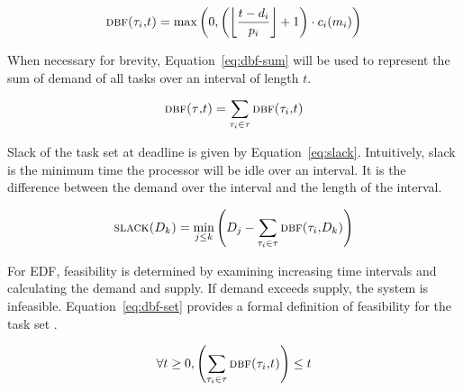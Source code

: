 \begin{definition}
  \begin{equation}
    \label{eq:dbf}
    \text{\sc{dbf}(\ensuremath{\tau_{i}},${t}$)} = \max \left(0,
      \left( \left\lfloor \frac{t - d_i}{p_i} \right\rfloor + 1
      \right) \cdot c_i(m_i)
    \right)
  \end{equation}
\end{definition}

When necessary for brevity, Equation~\ref{eq:dbf-sum} will be used to
represent the sum of demand of all tasks over an interval of length
${t}$.

\begin{definition} 
  \begin{equation}
    \label{eq:dbf-sum}
    \text{\sc{dbf}(\ensuremath{\tau}{},$t$)} = \sum_{\tau_{i} \in \tau} \text{\sc{dbf}(\ensuremath{\tau_{i}},$t$)}
  \end{equation}
\end{definition}


Slack of the task set \tasks{} at deadline  is given by
Equation~\ref{eq:slack}. Intuitively, slack is the minimum time the
processor will be idle over an interval. It is the difference between
the demand over the interval and the length of the interval.

\begin{definition}
  \begin{equation}
    \label{eq:slack}
    \text{\sc{slack}(${D_k}$)} = \min_{j \le k}
      \left( D_j - \sum_{\tau_{i} \in \tau} \text{\sc{dbf}(\ensuremath{\tau_{i}},\ensuremath{D_{k}})}
      \right)
  \end{equation}
\end{definition}

For EDF, feasibility is determined by examining increasing time
intervals and calculating the demand and supply. If demand exceeds
supply, the system is infeasible. Equation~\ref{eq:dbf-set} provides a
formal definition of feasibility for the task set \tasks{}.

\begin{definition}
  \begin{equation}
    \label{eq:dbf-set}
      \forall t \ge 0, 
      \left(
        \sum_{\tau_{i} \in \tau{}} \text{\sc{dbf}(\ensuremath{\tau_{i}},$t$)}
      \right)
      \le t
  \end{equation}
\end{definition}

